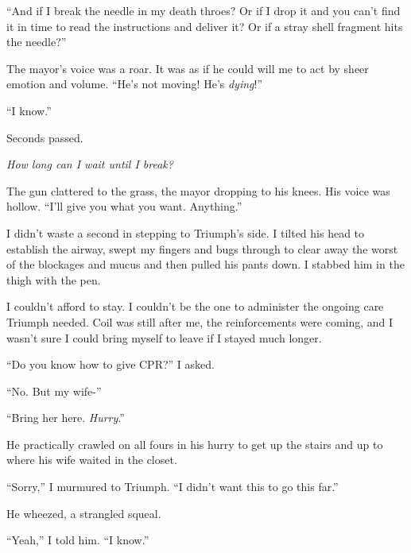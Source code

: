 ``And if I break the needle in my death throes?  Or if I drop it and you can't find it in time to read the instructions and deliver it?  Or if a stray shell fragment hits the needle?''



The mayor's voice was a roar.  It was as if he could will me to act by sheer emotion and volume.  ``He's not moving!  He's \emph{dying}!''



``I know.''



Seconds passed.



\emph{How long can I wait until I break?}



The gun clattered to the grass, the mayor dropping to his knees.  His voice was hollow.  ``I'll give you what you want.  Anything.''



I didn't waste a second in stepping to Triumph's side.  I tilted his head to establish the airway, swept my fingers and bugs through to clear away the worst of the blockages and mucus and then pulled his pants down.  I stabbed him in the thigh with the pen.



I couldn't afford to stay.  I couldn't be the one to administer the ongoing care Triumph needed.  Coil was still after me, the reinforcements were coming, and I wasn't sure I could bring myself to leave if I stayed much longer.



``Do you know how to give CPR?'' I asked.



``No.  But my wife-''



``Bring her here.  \emph{Hurry}.''



He practically crawled on all fours in his hurry to get up the stairs and up to where his wife waited in the closet.



``Sorry,'' I murmured to Triumph.  ``I didn't want this to go this far.''



He wheezed, a strangled squeal.



``Yeah,'' I told him.  ``I know.''



